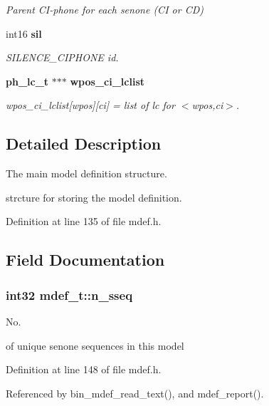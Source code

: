 \begin{DoxyCompactItemize}
\begin{DoxyCompactList}\small\item\em Parent C\+I-\/phone for each senone (C\+I or C\+D) \end{DoxyCompactList}\item 
int16 {\bf sil}\label{structmdef__t_acc9a57b57bbecaef55cc72be57b875f6}

\begin{DoxyCompactList}\small\item\em S\+I\+L\+E\+N\+C\+E\+\_\+\+C\+I\+P\+H\+O\+N\+E id. \end{DoxyCompactList}\item 
{\bf ph\+\_\+lc\+\_\+t} $\ast$$\ast$$\ast$ {\bf wpos\+\_\+ci\+\_\+lclist}
\begin{DoxyCompactList}\small\item\em wpos\+\_\+ci\+\_\+lclist[wpos][ci] = list of lc for $<$wpos,ci$>$. \end{DoxyCompactList}\end{DoxyCompactItemize}


\subsection{Detailed Description}
The main model definition structure. 

strcture for storing the model definition. 

Definition at line 135 of file mdef.\+h.



\subsection{Field Documentation}
\subsubsection[{n\+\_\+sseq}]{\setlength{\rightskip}{0pt plus 5cm}int32 mdef\+\_\+t\+::n\+\_\+sseq}\label{structmdef__t_ad9afd537734fe1f336e20218da28fb2c}


No. 

of unique senone sequences in this model 

Definition at line 148 of file mdef.\+h.



Referenced by bin\+\_\+mdef\+\_\+read\+\_\+text(), and mdef\+\_\+report().

